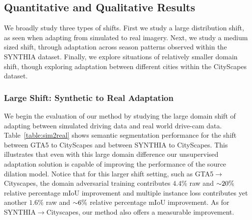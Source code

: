 \documentclass[10pt,twocolumn,letterpaper]{article}
\begin{document}
\subsection{Quantitative and Qualitative Results}

We broadly study three types of shifts. First we study a large distribution shift, as seen when adapting from simulated to real imagery. Next, we study a medium sized shift, through adaptation across season patterns observed within the SYNTHIA dataset. Finally, we explore situations of relatively smaller domain shift, though exploring adaptation between different cities within the CityScapes dataset.

\subsubsection{Large Shift: Synthetic to Real Adaptation}
We begin the evaluation of our method by studying the large domain shift of adapting between simulated driving data and real world drive-cam data. Table~\ref{table:sim2real} shows semantic segmentation performance for the shift between GTA5 to CityScapes and between SYNTHIA to CityScapes. This illustrates that even with this large domain difference our unsupervised adaptation solution is capable of improving the performance of the source dilation model. Notice that for this larger shift setting, such as GTA5$\rightarrow$Cityscapes, the domain adversarial training contributes $4.4\%$ raw and $\scriptsize{\sim} 20\%$ relative percentage mIoU improvement and multiple instance loss contributes yet another $1.6\%$ raw and $\scriptsize{\sim} 6\%$ relative percentage mIoU improvement. 
As for SYNTHIA$\rightarrow$Cityscapes, our method also offers a measurable improvement.
\end{document}
